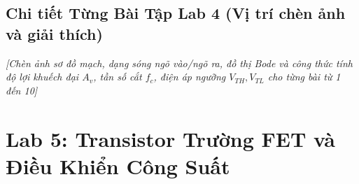 \documentclass[12pt,a4paper]{report}
\begin{document}
\begin{orangebox}
\centering
\vspace{0.3cm}
\vspace{0.3cm}
\end{orangebox}

\subsection*{Chi tiết Từng Bài Tập Lab 4 (Vị trí chèn ảnh và giải thích)}
\begin{orangebox}
\textit{\color{guidegray}[Chèn ảnh sơ đồ mạch, dạng sóng ngõ vào/ngõ ra, đồ thị Bode và công thức tính độ lợi khuếch đại $A_v$, tần số cắt $f_c$, điện áp ngưỡng $V_{TH}, V_{TL}$ cho từng bài từ 1 đến 10]}
\end{orangebox}

\section{Lab 5: Transistor Trường FET và Điều Khiển Công Suất}
\end{document}
